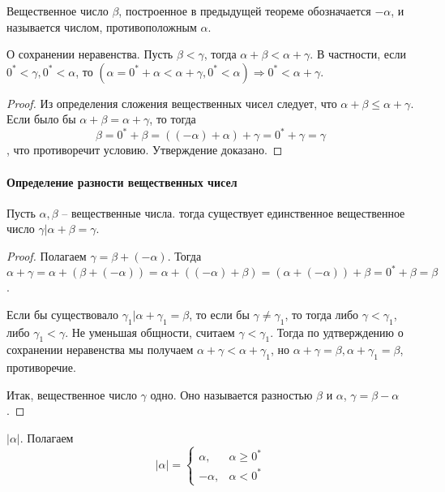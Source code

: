 \documentclass[main]{subfiles}
\begin{document}
\begin{definition}
    Вещественное число $\beta$, построенное в предыдущей теореме обозначается
    $-\alpha$, и называется числом, противоположным $\alpha$.
\end{definition}

\begin{assertion}
    О сохранении неравенства. Пусть $\beta < \gamma$, тогда $\alpha + \beta <
        \alpha + \gamma$. В частности, если $0^* < \gamma, 0^* < \alpha$, то
    $(\alpha = 0^* + \alpha < \alpha + \gamma, 0^* < \alpha) \Rightarrow
        0^* < \alpha + \gamma$.
\end{assertion}
\begin{proof}
    Из определения сложения вещественных чисел следует, что $\alpha + \beta \leq
        \alpha + \gamma$. Если было бы $\alpha + \beta = \alpha + \gamma$, то тогда
    \[\beta = 0^* + \beta = ((-\alpha) + \alpha) + \gamma = 0^* + \gamma = \gamma\],
    что противоречит условию. Утверждение доказано.
\end{proof}

\paragraph{Определение разности вещественных чисел}
\begin{theorem}
    Пусть $\alpha, \beta$ -- вещественные числа. тогда существует единственное
    вещественное число $\gamma | \alpha + \beta = \gamma$.
\end{theorem}
\begin{proof}
    Полагаем $\gamma = \beta + (-\alpha)$. Тогда $\alpha + \gamma = \alpha +
        (\beta + (-\alpha)) = \alpha + ((-\alpha) + \beta) = (\alpha + (-\alpha)) +
        \beta = 0^* + \beta = \beta$.

    Если бы существовало $\gamma_1 | \alpha + \gamma_1 = \beta$, то если бы
    $\gamma \neq \gamma_1$, то тогда либо $\gamma < \gamma_1$, либо $\gamma_1 <
        \gamma$. Не уменьшая общности, считаем $\gamma < \gamma_1$. Тогда по удтверждению
    о сохранении неравенства мы получаем $\alpha + \gamma < \alpha + \gamma_1$,
    но $\alpha + \gamma = \beta, \alpha + \gamma_1 = \beta$, противоречие.

    Итак, вещественное число $\gamma$ одно. Оно называется разностью $\beta$ и
    $\alpha$, $\gamma = \beta - \alpha$.
\end{proof}

\begin{definition}
    $|\alpha|$. Полагаем
    \begin{equation*}
        |\alpha| =
        \begin{cases}
            \alpha,  & \alpha \geq 0^* \\
            -\alpha, & \alpha < 0^*
        \end{cases}
    \end{equation*}
\end{definition}
\end{document}
